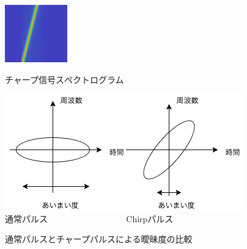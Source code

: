 \begin{figure}[p]\centering
\includegraphics[clip,width=0.7\hsize]{img/chirp_spectogram.png}\\
\caption{チャープ信号スぺクトログラム}\label{fig:chirpsig2}
\end{figure}


\begin{figure}[p]\centering
\includegraphics[clip,width=0.9\hsize]{img/aimai.png}\\
通常パルス~ ~ ~ ~ ~ ~ ~ ~ ~ ~ ~ Chirpパルス
\caption{通常パルスとチャープパルスによる曖昧度の比較}\label{fig:chirppulse_amb}
\end{figure}



